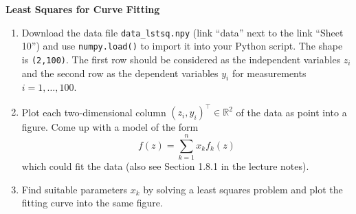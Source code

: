 \textbf{Least Squares for Curve Fitting}
\begin{enumerate}
	\item Download the data file \texttt{data\_lstsq.npy} (link ``data'' next to the link ``Sheet 10'') and use \texttt{numpy.load()} to import it into your Python script. The shape is \texttt{(2,100)}. The first row should be considered as the independent variables $z_i$ and the second row as the dependent variables $y_i$ for measurements $i=1,\ldots,100$.
	\item Plot each two-dimensional column $(z_i,y_i)^\top \in \mathbb{R}^2$ of the data as point into a figure. Come up with a model of the form $$f(z) = \sum_{k=1}^n x_k f_k(z)$$ which could fit the data (also see Section 1.8.1 in the lecture notes).
	\item Find suitable parameters $x_k$ by solving a least squares problem and plot the fitting curve into the same figure.
\end{enumerate}
